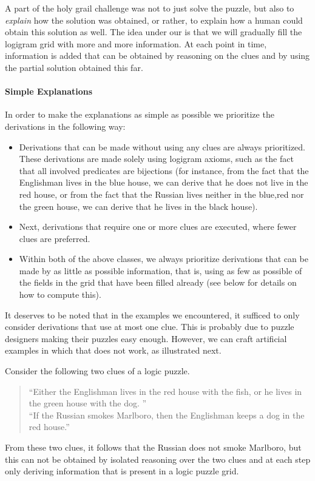 A part of the holy grail challenge was not to just solve the puzzle, but also to \emph{explain} how the solution was obtained, or rather, to explain how a human could obtain this solution as well. 
The idea under our is that we will gradually fill the logigram grid with more and more information. At each point in time, information is added that can be obtained by reasoning on the clues and by using the partial solution obtained this far. 

\paragraph{Simple Explanations}
In order to make the explanations as simple as possible we prioritize the derivations in the following way: 
\begin{itemize}
 \item Derivations that can be made without using any clues are always prioritized. These derivations are made solely using logigram axioms, such as the fact that all involved predicates are bijections (for instance, from the fact that the Englishman lives in the blue house, we can derive that he does not live in the red house, or from the fact that the Russian lives neither in the blue,red nor the green house, we can derive that he lives in the black house). 
 \item Next, derivations that require one or more clues are executed, where fewer clues are preferred. 
 \item Within both of the above classes, we always prioritize derivations that can be made by as little as possible information, that is, using as few as possible of the fields in the grid that have been filled already (see below for details on how to compute this).
\end{itemize}
It deserves to be noted that in the examples we encountered, it sufficed to only consider derivations that use at most one clue. This is probably due to puzzle designers making their puzzles easy enough. However, we can craft artificial examples in which that does not work, as illustrated next. 
\begin{example}
 Consider the following two clues of a logic puzzle. 
 \begin{quote}
  ``Either the Englishman lives in the red house with the fish, or he lives in the green house with the dog. '' \\
  ``If the Russian smokes Marlboro, then the Englishman keeps a dog in the red house.'' 
 \end{quote}
From these two clues, it follows that the Russian does not smoke Marlboro, but this can not be obtained by isolated reasoning over the two clues and at each step only deriving information that is present in a logic puzzle grid.
\end{example}

